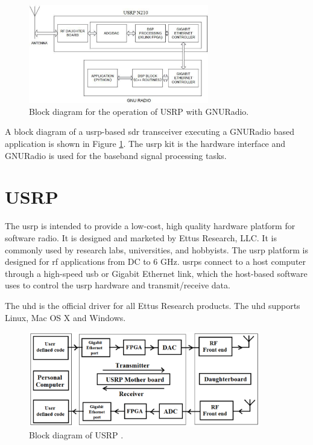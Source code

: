\begin{figure}
  \centering
  \includegraphics[width=0.7\textwidth]{../images/usrpGNURadioBlock}
  \caption[USRP operation with GNURadio]{Block diagram for the operation of USRP
  with GNURadio.}
  \label{usrpGNURadioBlock}
\end{figure}

A block diagram of a \gls{usrp}-based \gls{sdr} transceiver executing a GNURadio based 
application is shown in Figure \ref{usrpGNURadioBlock}. The \gls{usrp} kit is the 
hardware interface and GNURadio is used for the baseband signal processing
tasks.


\section{USRP}

The \gls{usrp} is intended to provide a 
low-cost, high quality hardware platform for software radio. It is designed
and marketed by Ettus Research, LLC. It is commonly used by research labs,
universities, and hobbyists. The \gls{usrp} platform is designed for \gls{rf} applications
from DC to 6 GHz. \gls{usrp}s connect to a host computer through a high-speed \gls{usb} or
Gigabit Ethernet link, which the host-based software uses to control the \gls{usrp}
hardware and transmit/receive data.

The \gls{uhd} is the official driver for all Ettus Research
products. The \gls{uhd} supports Linux, Mac OS X and Windows.

\begin{figure}
\centering
\includegraphics[width=0.9\textwidth]{../images/usrpBlock}
\caption[Block diagram of USRP]{Block diagram of USRP
\protect\cite{kranthi13}.}
\label{usrpBlock}
\end{figure}

